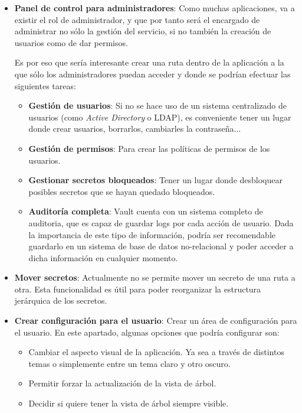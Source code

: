 \documentclass{\ClassPath/viu-tfm-template}
\begin{document}
\begin{itemize}
    \item \textbf{Panel de control para administradores}: Como muchas aplicaciones, va a existir el rol de administrador, y que por tanto será el encargado de administrar no sólo la gestión del servicio, si no también la creación de usuarios como de dar permisos.

    Es por eso que sería interesante crear una ruta dentro de la aplicación a la que sólo los administradores puedan acceder y donde se podrían efectuar las siguientes tareas:

    \begin{itemize}
        \item \textbf{Gestión de usuarios}: Si no se hace uso de un sistema centralizado de usuarios (como \textit{Active Directory} o LDAP), es conveniente tener un lugar donde crear usuarios, borrarlos, cambiarles la contraseña...
        \item \textbf{Gestión de permisos}: Para crear las políticas de permisos de los usuarios.
        \item \textbf{Gestionar secretos bloqueados}: Tener un lugar donde desbloquear posibles secretos que se hayan quedado bloqueados.
        \item \textbf{Auditoría completa}: Vault cuenta con un sistema completo de auditoria, que es capaz de guardar logs por cada acción de usuario. Dada la importancia de este tipo de información, podría ser recomendable guardarlo en un sistema de base de datos no-relacional y poder acceder a dicha información en cualquier momento.
    \end{itemize}

    \item \textbf{Mover secretos}: Actualmente no se permite mover un secreto de una ruta a otra. Esta funcionalidad es útil para poder reorganizar la estructura jerárquica de los secretos.

    \item \textbf{Crear configuración para el usuario}: Crear un área de configuración para el usuario. En este apartado, algunas opciones que podría configurar son:

    \begin{itemize}
        \item Cambiar el aspecto visual de la aplicación. Ya sea a través de distintos temas o simplemente entre un tema claro y otro oscuro.
        \item Permitir forzar la actualización de la vista de árbol.
        \item Decidir si quiere tener la vista de árbol siempre visible.
    \end{itemize}


\end{itemize}
\end{document}
